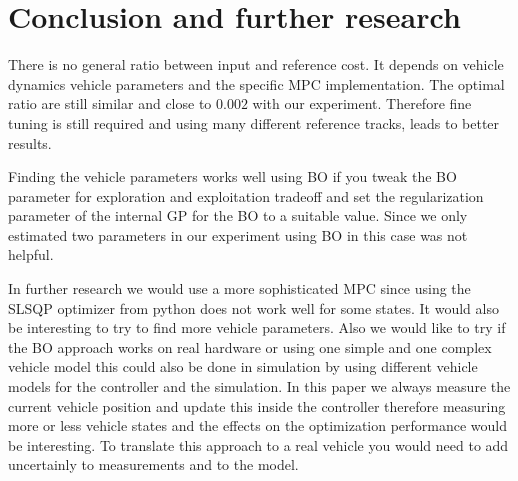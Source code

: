 \documentclass[twoside,twocolumn]{article}
\begin{document}
\section{Conclusion and further research}
There is no general ratio between input and reference cost. It depends on vehicle dynamics vehicle parameters and the specific MPC implementation. The optimal ratio are still similar and close to $0.002$ with our experiment. Therefore fine tuning is still required and using many different reference tracks, leads to better results.

Finding the vehicle parameters works well using BO if you tweak the BO parameter for exploration and exploitation tradeoff and set the regularization parameter of the internal GP for the BO to a suitable value. Since we only estimated two parameters in our experiment using BO in this case was not helpful.

In further research we would use a more sophisticated MPC since using the SLSQP optimizer from python does not work well for some states. It would also be interesting to try to find more vehicle parameters. Also we would like to try if the BO approach works on real hardware or using one simple and one complex vehicle model this could also be done in simulation by using different vehicle models for the controller and the simulation. In this paper we always measure the current vehicle position and update this inside the controller therefore measuring more or less vehicle states and the effects on the optimization performance would be interesting. To translate this approach to a real vehicle you would need to add uncertainly to measurements and to the model.



\end{document}
